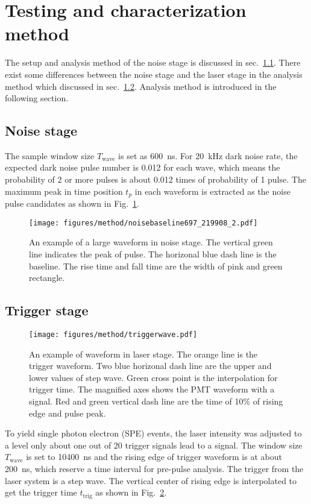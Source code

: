 \section{Testing and characterization method}
\label{Method}
The setup and analysis method of the noise stage is discussed in sec.~\ref{sec:noisestage}. There exist some differences between the noise stage and the laser stage in the analysis method which discussed in sec.~\ref{sec:laserstage}. Analysis method is introduced in the following section.
\subsection{Noise stage}
\label{sec:noisestage}
The sample window size $T_{\mathrm{wave}}$ is set as \SI{600}{ns}. For \SI{20}{kHz} dark noise rate, the expected dark noise pulse number is 0.012 for each wave, which means the probability of 2 or more pulses is about 0.012 times of probability of 1 pulse. The maximum peak in time position $t_p$ in each waveform is extracted as the noise pulse candidates as shown in Fig.~\ref{fig:baseline1}.
\begin{figure}[!htbp]
    \centering
    \texttt{[image: figures/method/noisebaseline697\_219908\_2.pdf]}
    \caption{An example of a large waveform in noise stage. The vertical green line indicates the peak of pulse. The horizonal blue dash line is the baseline. The rise time and fall time are the width of pink and green rectangle.}
    \label{fig:baseline1}
\end{figure}
\subsection{Trigger stage}
\label{sec:laserstage}

\begin{figure}[!htbp]
    \centering
    \texttt{[image: figures/method/triggerwave.pdf]}
    \caption{An example of waveform in laser stage. The orange line is the trigger waveform. Two blue horizonal dash line are the upper and lower values of step wave. Green cross point is the interpolation for trigger time. The magnified axes shows the PMT waveform with a signal. Red and green vertical dash line are the time of 10\% of rising edge and pulse peak.}
    \label{fig:triggertime}
\end{figure}

To yield single photon electron (SPE) events, the laser intensity was adjusted to a level only about one out of 20 trigger signals lead to a signal. The window size $T_{\mathrm{wave}}$ is set to \SI{10400}{ns} and the rising edge of trigger waveform is at about \SI{200}{ns}, which reserve a time interval for pre-pulse analysis. The trigger from the laser system is a step wave. The vertical center of rising edge is interpolated to get the trigger time $t_{\mathrm{trig}}$ as shown in Fig.~\ref{fig:triggertime}.

